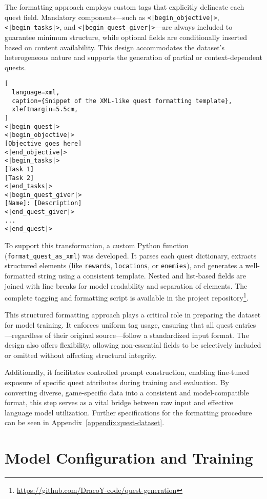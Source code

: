 The formatting approach employs custom tags that explicitly delineate each quest
field. Mandatory components—such as \texttt{<|begin\_objective|>}, \texttt{<|begin\_tasks|>}, and \texttt{<|begin\_quest\_giver|>}—are always included to guarantee minimum structure, while
optional fields are conditionally inserted based on content availability. This design accommodates
the dataset's heterogeneous nature and supports the generation of partial or
context-dependent quests.

\begin{lstlisting}[
  language=xml,
  caption={Snippet of the XML-like quest formatting template},
  xleftmargin=5.5cm,
]
<|begin_quest|>
<|begin_objective|>
[Objective goes here]
<|end_objective|>
<|begin_tasks|>
[Task 1]
[Task 2]
<|end_tasks|>
<|begin_quest_giver|>
[Name]: [Description]
<|end_quest_giver|>
...
<|end_quest|>
\end{lstlisting}

To support this transformation, a custom Python function (\texttt{format\_quest\_as\_xml})
was developed. It parses each quest dictionary, extracts structured elements (like \texttt{rewards},
\texttt{locations}, or \texttt{enemies}), and generates a well-formatted string using a consistent template.
Nested and list-based fields are joined with line breaks for model readability and
separation of elements. The complete tagging and formatting script is available in the
project repository\footnote{\url{https://github.com/DracoY-code/quest-generation}}.

This structured formatting approach plays a critical role in preparing the dataset for
model training. It enforces uniform tag usage, ensuring that all quest entries—regardless
of their original source—follow a standardized input format. The design also offers flexibility,
allowing non-essential fields to be selectively included or omitted without affecting
structural integrity.

Additionally, it facilitates controlled prompt construction, enabling fine-tuned exposure
of specific quest attributes during training and evaluation. By converting diverse,
game-specific data into a consistent and model-compatible format, this step serves as a
vital bridge between raw input and effective language model utilization. Further specifications
for the formatting procedure can be seen in Appendix~\ref{appendix:quest-dataset}.

\section{Model Configuration and Training}

